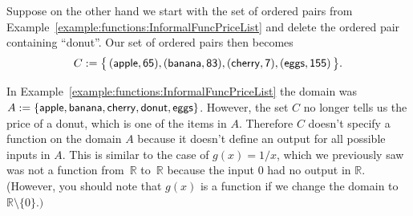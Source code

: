 Suppose  on the other hand we start with  the set of ordered pairs from Example~\ref{example:functions:InformalFuncPriceList} and delete the ordered pair containing ``donut''.  Our set of ordered pairs then becomes
 $$ C := \bigl\{\, (\sf{apple}, 65), 
 (\sf{banana}, 83), 
 (\sf{cherry}, 7),
  (\sf{eggs}, 155) \,\bigr\} .$$

In Example~\ref{example:functions:InformalFuncPriceList} the domain was $A:=\{  \sf{apple} , \sf{banana} , \sf{cherry} , \sf{donut} , \sf{eggs} \}$. However, the set $C$ no longer tells us the price of a donut, which is one of the items in $A$.   Therefore $C$ doesn't specify a function on the domain $A$  because it doesn't define an output for all possible inputs in $A$. This is similar to the case of $g(x) = 1/x$, which we previously saw was not a function from~$\mathbb{R}$ to~$\mathbb{R}$ because the input 0 had no output in $\mathbb{R}$.  (However, you should note that $g(x)$ is a function if we change  the domain to $\mathbb{R} \setminus \{0\}.)$ 

